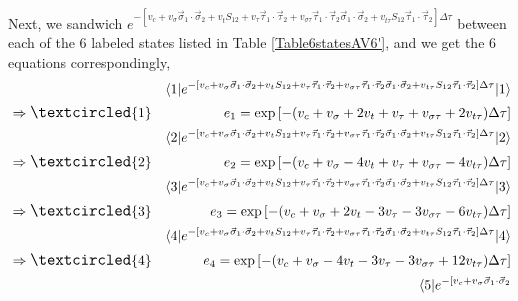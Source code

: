 \documentclass[12pt,letterpaper,UTF8]{report}
\begin{document}
{Next, we sandwich $e^{-[
v_c + v_\sigma \vec \sigma_1 \cdot \vec \sigma_2
+ v_t S_{12}
+ v_\tau \vec \tau_1 \cdot \vec \tau_2
+ v_{\sigma \tau} \vec \tau_1 \cdot \vec \tau_2 \vec \sigma_1 \cdot \vec\sigma_2
+v_{t \tau} S_{12} \vec \tau_1 \cdot \vec \tau_2
] \Delta \tau}$ between each of the 6 labeled states listed in Table \ref{Table6statesAV6'}, and we get the 6 equations correspondingly,
\begin{eqnarray}
&& \langle 1 |  e^{-[
v_c + v_\sigma \vec \sigma_1 \cdot \vec \sigma_2
+ v_t S_{12}
+ v_\tau \vec \tau_1 \cdot \vec \tau_2
+ v_{\sigma \tau} \vec \tau_1 \cdot \vec \tau_2 \vec \sigma_1 \cdot \vec\sigma_2
+v_{t \tau} S_{12} \vec \tau_1 \cdot \vec \tau_2
] \Delta \tau}  | 1 \rangle \nonumber \\
&\Rightarrow {\large \textcircled{\small 1}} &
e_1 = \exp \left[-(v_c+v_\sigma+2 v_t + v_\tau +v_{\sigma\tau} +2v_{t\tau})\Delta \tau \right]
\nonumber\\
&& \langle 2 |  e^{-[
v_c + v_\sigma \vec \sigma_1 \cdot \vec \sigma_2
+ v_t S_{12}
+ v_\tau \vec \tau_1 \cdot \vec \tau_2
+ v_{\sigma \tau} \vec \tau_1 \cdot \vec \tau_2 \vec \sigma_1 \cdot \vec\sigma_2
+v_{t \tau} S_{12} \vec \tau_1 \cdot \vec \tau_2
] \Delta \tau}  | 2 \rangle \nonumber \\
&\Rightarrow {\large \textcircled{\small 2}} &
e_2 = \exp \left[-(v_c+v_\sigma-4v_t + v_\tau +v_{\sigma\tau} -4v_{t\tau})\Delta \tau \right]
\nonumber\\
&& \langle 3 |  e^{-[
v_c + v_\sigma \vec \sigma_1 \cdot \vec \sigma_2
+ v_t S_{12}
+ v_\tau \vec \tau_1 \cdot \vec \tau_2
+ v_{\sigma \tau} \vec \tau_1 \cdot \vec \tau_2 \vec \sigma_1 \cdot \vec\sigma_2
+v_{t \tau} S_{12} \vec \tau_1 \cdot \vec \tau_2
] \Delta \tau}  | 3 \rangle \nonumber \\
&\Rightarrow {\large \textcircled{\small 3}} &
e_3 = \exp \left[-(v_c+v_\sigma+2v_t -3 v_\tau -3v_{\sigma\tau} -6v_{t\tau})\Delta \tau \right]
\nonumber\\
&& \langle 4 |  e^{-[
v_c + v_\sigma \vec \sigma_1 \cdot \vec \sigma_2
+ v_t S_{12}
+ v_\tau \vec \tau_1 \cdot \vec \tau_2
+ v_{\sigma \tau} \vec \tau_1 \cdot \vec \tau_2 \vec \sigma_1 \cdot \vec\sigma_2
+v_{t \tau} S_{12} \vec \tau_1 \cdot \vec \tau_2
] \Delta \tau}  | 4 \rangle \nonumber \\
&\Rightarrow {\large \textcircled{\small 4}} &
e_4 = \exp \left[-(v_c+v_\sigma-4v_t -3 v_\tau -3v_{\sigma\tau}+12v_{t\tau})\Delta \tau \right]
\nonumber\\
&& \langle 5 |  e^{-[
v_c + v_\sigma \vec \sigma_1 \cdot \vec \sigma_2
}
\end{eqnarray}}
\end{document}
